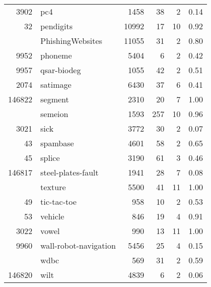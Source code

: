 \begin{longtable}{rlrrrp{2em}}
3902 & pc4 & 1458 & 38 & 2 & 0.14 \\
32 & pendigits & 10992 & 17 & 10 & 0.92 \\
\addlinespace
14952 & PhishingWebsites & 11055 & 31 & 2 & 0.80 \\
9952 & phoneme & 5404 & 6 & 2 & 0.42 \\
9957 & qsar-biodeg & 1055 & 42 & 2 & 0.51 \\
2074 & satimage & 6430 & 37 & 6 & 0.41 \\
146822 & segment & 2310 & 20 & 7 & 1.00 \\
\addlinespace
9964 & semeion & 1593 & 257 & 10 & 0.96 \\
3021 & sick & 3772 & 30 & 2 & 0.07 \\
43 & spambase & 4601 & 58 & 2 & 0.65 \\
45 & splice & 3190 & 61 & 3 & 0.46 \\
146817 & steel-plates-fault & 1941 & 28 & 7 & 0.08 \\
\addlinespace
125922 & texture & 5500 & 41 & 11 & 1.00 \\
49 & tic-tac-toe & 958 & 10 & 2 & 0.53 \\
53 & vehicle & 846 & 19 & 4 & 0.91 \\
3022 & vowel & 990 & 13 & 11 & 1.00 \\
9960 & wall-robot-navigation & 5456 & 25 & 4 & 0.15 \\
\addlinespace
9946 & wdbc & 569 & 31 & 2 & 0.59 \\
146820 & wilt & 4839 & 6 & 2 & 0.06 \\
\bottomrule
\end{longtable}